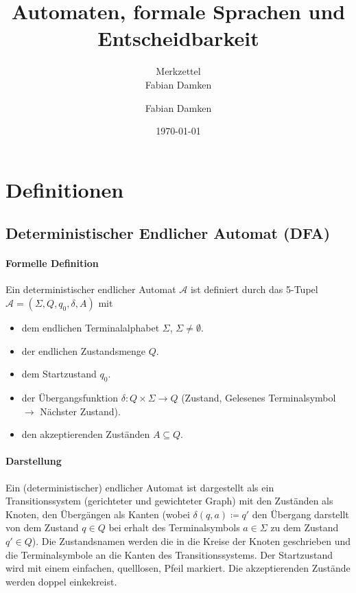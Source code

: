 \documentclass[a4paper, 11pt, accentcolor = tud3b]{tudreport}
\title{Automaten, formale Sprachen und Entscheidbarkeit}
\subtitle{Merkzettel \\ Fabian Damken}
\author{Fabian Damken}
\date{\today}
\begin{document}
    \maketitle
    \tableofcontents
    \listoftodos

    \section{Definitionen}
        \subsection{Deterministischer Endlicher Automat (DFA)}
            \paragraph{Formelle Definition}
                Ein deterministischer endlicher Automat $ \mathcal{A} $ ist definiert durch das 5-Tupel $ \mathcal{A} = (\Sigma, Q, q _ 0, \delta, A) $ mit
                \begin{itemize}
                    \item dem endlichen Terminalalphabet $ \Sigma $, $ \Sigma \neq \emptyset $.
                    \item der endlichen Zustandsmenge $ Q $.
                    \item dem Startzustand $ q _ 0 $.
                    \item der Übergangsfunktion $ \delta : Q \times \Sigma \rightarrow Q $ (Zustand, Gelesenes Terminalsymbol $ \rightarrow $ Nächster Zustand).
                    \item den akzeptierenden Zuständen $ A \subseteq Q $.
                \end{itemize}

            \paragraph{Darstellung}
                \label{dfa:darstellung}
                Ein (deterministischer) endlicher Automat ist dargestellt als ein Transitionssystem (gerichteter und gewichteter Graph) mit den Zuständen als Knoten, den Übergängen als Kanten (wobei $ \delta(q, a) \coloneqq q' $ den Übergang darstellt von dem Zustand $ q \in Q $ bei erhalt des Terminalsymbols $ a \in \Sigma $ zu dem Zustand $ q' \in Q $). Die Zustandsnamen werden die in die Kreise der Knoten geschrieben und die Terminalsymbole an die Kanten des Transitionssystems. Der Startzustand wird mit einem einfachen, quelllosen, Pfeil markiert. Die akzeptierenden Zustände werden doppel einkekreist.
\end{document}
